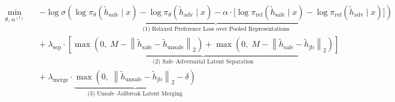 \begin{figure}[htp!]
\vspace{-4mm}
\centering
\begin{tcolorbox}[
  enhanced,
  colback=white,
  colframe=black,
  boxrule=1pt,
  borderline={0.6pt}{2pt}{black},
  sharp corners,
  width=\textwidth,
]
\vspace{-4mm}
\[
\begin{aligned}
\min_{\theta,\, \alpha^{(l)}} \quad & 
\underbrace{-\log \sigma\left(
\log \pi_\theta(\tilde{h}_{\mathrm{safe}} \mid x)
- \log \pi_\theta(\tilde{h}_{\mathrm{adv}} \mid x)
- \alpha \cdot \big[
\log \pi_{\mathrm{ref}}(\tilde{h}_{\mathrm{safe}} \mid x)
- \log \pi_{\mathrm{ref}}(\tilde{h}_{\mathrm{adv}} \mid x)
\big]
\right)}_{\text{(1) Relaxed Preference Loss over Pooled Representations}} \\[6pt]
& +\; \lambda_{\mathrm{sep}} \cdot
\underbrace{
\left[
\max\left(0,\; M - \left\| \tilde{h}_{\mathrm{safe}} - \tilde{h}_{\mathrm{unsafe}} \right\|_2 \right)
+
\max\left(0,\; M - \left\| \tilde{h}_{\mathrm{safe}} - \tilde{h}_{\mathrm{jb}} \right\|_2 \right)
\right]
}_{\text{(2) Safe--Adversarial Latent Separation}} \\[6pt]
& +\; \lambda_{\mathrm{merge}} \cdot
\underbrace{
\max\left(0,\; \left\| \tilde{h}_{\mathrm{unsafe}} - \tilde{h}_{\mathrm{jb}} \right\|_2 - \delta \right)
}_{\text{(3) Unsafe--Jailbreak Latent Merging}} \\[8pt]
\end{aligned}
\]
\vspace{-4mm}
\end{tcolorbox}


\end{figure}
